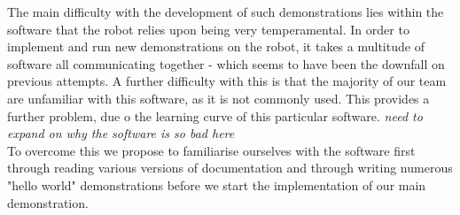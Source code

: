 \documentclass[paper=a4, fontsize=11pt]{scrartcl}
\numberwithin{equation}{section}		%
\numberwithin{figure}{section}			%
\numberwithin{table}{section}				%
\begin{document}
The main difficulty with the development of such demonstrations lies within the software that the robot relies upon being very temperamental. In order to implement and run new demonstrations on the robot, it takes a multitude of software all communicating together - which seems to have been the downfall on previous attempts. A further difficulty with this is that the majority of our team are unfamiliar with this software, as it is not commonly used. This provides a further problem, due o the learning curve of this particular software. \textit{need to expand on why the software is so bad here} \\
To overcome this we propose to familiarise ourselves with the software first through reading various versions of documentation and through writing numerous "hello world" demonstrations before we start the implementation of our main demonstration.\\









\end{document}
